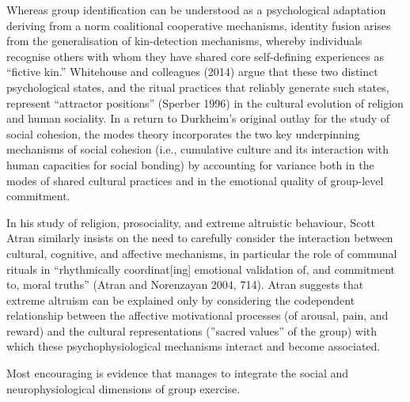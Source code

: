 Whereas group identification can be understood as a psychological adaptation deriving from a norm coalitional cooperative mechanisms, identity fusion arises from the generalisation of kin-detection mechanisms, whereby individuals recognise others with whom they have shared core self-defining experiences as ``fictive kin.'' Whitehouse and colleagues (2014) argue that these two distinct psychological states, and the ritual practices that reliably generate such states, represent ``attractor positions'' (Sperber 1996) in the cultural evolution of religion and human sociality. In a return to Durkheim’s original outlay for the study of social cohesion, the modes theory incorporates the two key underpinning mechanisms of social cohesion (i.e., cumulative culture and its interaction with human capacities for social bonding) by accounting for variance both in the modes of shared cultural practices and in the emotional quality of group-level commitment.

In his study of religion, prosociality, and extreme altruistic behaviour, Scott Atran similarly insists on the need to carefully consider the interaction between cultural, cognitive, and affective mechanisms, in particular the role of communal rituals in ``rhythmically coordinat[ing] emotional validation of, and commitment to, moral truths'' (Atran and Norenzayan 2004, 714). Atran suggests that extreme altruism can be explained only by considering the codependent relationship between the affective motivational processes (of arousal, pain, and reward) and the cultural representations (''sacred values'' of the group) with which these psychophysiological mechanisms interact and become associated.



Most encouraging is evidence that manages to integrate the social and neurophysiological dimensions of group exercise.








